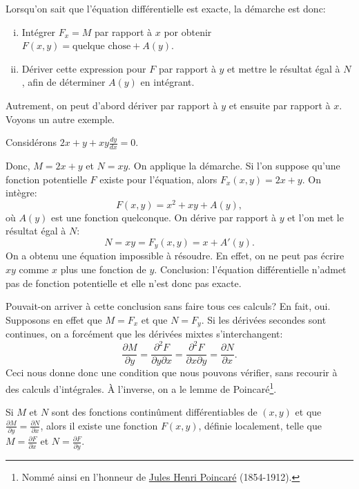 Lorsqu'on sait que l'équation différentielle est exacte, la démarche est donc:
\begin{enumerate}[(i)]
	\item Intégrer $F_x = M$ par rapport à $x$ por obtenir $F(x, y) = \text{quelque chose} + A(y)$.
	\item Dériver cette expression pour $F$ par rapport à $y$ et mettre le résultat égal à
			$N$, afin de déterminer $A(y)$ en intégrant.
\end{enumerate}
Autrement, on peut d'abord dériver par rapport à $y$ et ensuite par rapport à $x$.
Voyons un autre exemple.

\begin{example}
	Considérons $2x+y + xy \frac{dy}{dx} = 0$.

	Donc, $M = 2x+y$ et $N=xy$.  On applique la démarche.
	Si l'on suppose qu'une fonction potentielle $F$ existe pour l'équation, alors $F_x (x,y) = 2x+y$.
	On intègre:
	\begin{equation*}
		F(x,y) = x^2 + xy + A(y),
	\end{equation*}
	où $A(y)$ est une fonction quelconque. On dérive par rapport à $y$ et l'on met le résultat égal à $N$:
	\begin{equation*}
		N = xy = F_y (x,y) = x+A'(y) .
	\end{equation*}
	On a obtenu une équation impossible à résoudre.  En effet, on ne peut pas écrire $xy$ comme
	$x$ plus une fonction de $y$.
	Conclusion: l'équation différentielle n'admet pas de fonction potentielle et elle n'est donc pas exacte.
\end{example}

Pouvait-on arriver à cette conclusion sans faire tous ces calculs?  En fait, oui.  Supposons en effet que
$M = F_x$ et que 
$N = F_y$.  Si les dérivées secondes sont continues, on a forcément que les dérivées mixtes s'interchangent:
\begin{equation*}
	\frac{\partial M}{\partial y}
		= 	\frac{\partial^2 F}{\partial y \partial x}
		=	\frac{\partial^2 F}{\partial x \partial y}
		= 	\frac{\partial N}{\partial x} .
\end{equation*}
Ceci nous donne donc une condition que nous pouvons vérifier, sans recourir à des calculs d'intégrales.
À l'inverse, on a le lemme de Poincaré\footnote{Nommé ainsi en l'honneur de
\href{https://en.wikipedia.org/wiki/Henri_Poincar\%C3\%A9}{Jules Henri
Poincaré} (1854-1912).}.

\begin{theorem}[Poincaré]
Si $M$ et $N$ sont des fonctions continûment différentiables de $(x, y)$ et
que $\frac{\partial M}{\partial y} = \frac{\partial N}{\partial x}$,
alors il existe une fonction $F(x,y)$, définie localement, telle que $M = \frac{\partial F}{\partial x}$ et
$N = \frac{\partial F}{\partial y}$.
\end{theorem}

